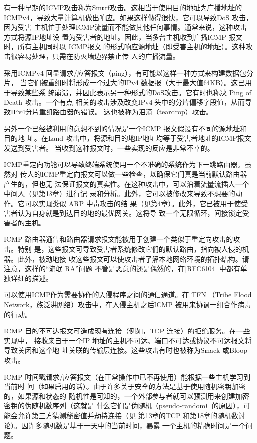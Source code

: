 有一种早期的ICMP攻击称为Smurf攻击。这相当于使用目的地址为广播地址的
ICMPv4，导致大量计算机做出响应。如果这样做得很快，它可以导致DoS 攻击，因为受害
主机忙于处理ICMP流量而不能做其他任何事情。通常来说，这种攻击方式将源IP地址设
置为受害者的地址。因此，当多台主机收到广播ICMP 报文时，所有主机同时以 ICMP报文
的形式响应源地址（即受害主机的地址）。这种攻击很容易处理，只需在防火墙边界禁止传
人的广播流量。

采用ICMPv4 回显请求/应答报文（ping），有可能以这样一种方式来构建数据包分片，
当它们被重组时将形成一个过大的IPv4 数据报（大于最大值64KB）。这已用于导致某些系
统崩溃，并因此表示另一种形式的DoS攻击。它有时也称决 Ping of Death 攻击。一个有点
相关的攻击涉及改变IPv4 头中的分片偏移字段值，从而导致IPv4分片重组路由器的错误。
这也被称为泪滴（teardrop）攻击。

另外一个已经被利用的意想不到的情况是一个ICMP 报文假设有不同的源地址和目的地
址。在Land 攻击中，将源和目的地IP地址均等于受害者地址的ICMP报文发送到受害者。
当收到这种报文时，一些实现的反应是非常不幸的。

ICMP重定向功能可以导致终端系统使用一个不准确的系统作为下一跳路由器。虽然对
传人的ICMP重定向报文可以做一些检查，以确保它们真是当前默认路由器产生的，但也无
法保证报文的真实性。在这种攻击中，可以沿着流量流插人一个中间人（见第18章）进行记
录和分析。此外，它可以被修改来导致不想要的动作。它可以实现类似 ARP 中毒攻击的结
果（见第4章）。此外，它已被用于使受害者认为自身就是到达目的地的最优网关。这将导
致一个无限循环，间接锁定受害者的主机。

ICMP 路由器通告和路由器请求报文能被用于创建一个类似于重定向攻击的攻击。特别
是，这些报文可导致受害者系统修改它们的默认路由，指向被人侵的机器。此外，被动地接
收这些报文可以使攻击者了解本地网络环境的拓扑结构。请注意，这样的“流氓 RA”问题
不管是恶意的还是偶然的，在\href{https://www.rfc-editor.org/rfc/rfc6104}{[RFC6104]}
中都有单独详细的描述。

可以使用ICMP作为需要协作的入侵程序之间的通信通道。在 TFN （Tribe Flood
Network，族泛洪网络）攻击中，在人侵主机之后ICMP 被用来协调一组合作病毒的行动。

ICMP 目的不可达报文可造成现有连接（例如，TCP 连接）的拒绝服务。在一些实现中，
接收来自于一个IP 地址的主机不可达、端口不可达或协议不可达报文将导致关闭和这个地
址关联的传输层连接。这些攻击有时也被称为Smack 或Bloop 攻击。

ICMP 时间戳请求/应答报文（在正常操作中已不再使用）能根据一些主机学习到当前时
间（如果启用的话）。由于许多关于安全的方法是基于使用随机密钥加密的，如果源和状态的
随机性是可知的，一个外部参与者就可以预测用来创建加密密钥的伪随机数序列（这就是
什么它们是伪随机（pseudo-random）的原因），可能会允许第三方猜测秘密值并劫持连接（见
第13章的TCP 和第18章的随机数讨论）。因许多随机数是基于一天中的当前时间，暴露
一个主机的精确时间是一个问题。

